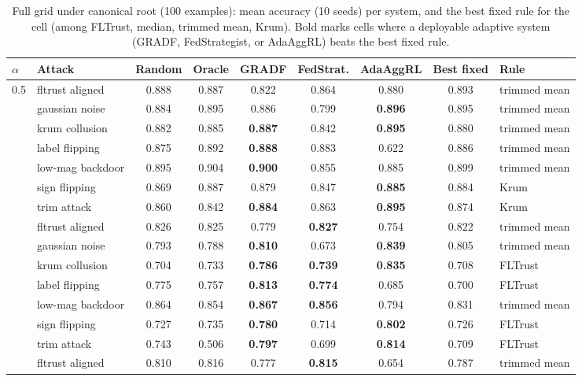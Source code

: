 \begin{table}[t]
\centering
\small
\caption{Full grid under canonical root (100 examples): mean accuracy (10 seeds) per system, and the best fixed rule for the cell (among FLTrust, median, trimmed mean, Krum). Bold marks cells where a deployable adaptive system (GRADF, FedStrategist, or AdaAggRL) beats the best fixed rule.}
\label{tab:full-grid-root100}
\begin{tabular}{llccccccl}
\toprule
$\alpha$ & Attack & Random & Oracle & GRADF & FedStrat. & AdaAggRL & Best fixed & Rule \\
\midrule
0.5 & fltrust aligned & 0.888 & 0.887 & 0.822 & 0.864 & 0.880 & 0.893 & trimmed mean \\
 & gaussian noise & 0.884 & 0.895 & 0.886 & 0.799 & \textbf{0.896} & 0.895 & trimmed mean \\
 & krum collusion & 0.882 & 0.885 & \textbf{0.887} & 0.842 & \textbf{0.895} & 0.880 & trimmed mean \\
 & label flipping & 0.875 & 0.892 & \textbf{0.888} & 0.883 & 0.622 & 0.886 & trimmed mean \\
 & low-mag backdoor & 0.895 & 0.904 & \textbf{0.900} & 0.855 & 0.885 & 0.899 & trimmed mean \\
 & sign flipping & 0.869 & 0.887 & 0.879 & 0.847 & \textbf{0.885} & 0.884 & Krum \\
 & trim attack & 0.860 & 0.842 & \textbf{0.884} & 0.863 & \textbf{0.895} & 0.874 & Krum \\
\addlinespace
0.1 & fltrust aligned & 0.826 & 0.825 & 0.779 & \textbf{0.827} & 0.754 & 0.822 & trimmed mean \\
 & gaussian noise & 0.793 & 0.788 & \textbf{0.810} & 0.673 & \textbf{0.839} & 0.805 & trimmed mean \\
 & krum collusion & 0.704 & 0.733 & \textbf{0.786} & \textbf{0.739} & \textbf{0.835} & 0.708 & FLTrust \\
 & label flipping & 0.775 & 0.757 & \textbf{0.813} & \textbf{0.774} & 0.685 & 0.700 & FLTrust \\
 & low-mag backdoor & 0.864 & 0.854 & \textbf{0.867} & \textbf{0.856} & 0.794 & 0.831 & trimmed mean \\
 & sign flipping & 0.727 & 0.735 & \textbf{0.780} & 0.714 & \textbf{0.802} & 0.726 & FLTrust \\
 & trim attack & 0.743 & 0.506 & \textbf{0.797} & 0.699 & \textbf{0.814} & 0.709 & FLTrust \\
\addlinespace
0.05 & fltrust aligned & 0.810 & 0.816 & 0.777 & \textbf{0.815} & 0.654 & 0.787 & trimmed mean \\

\end{tabular}
\end{table}
